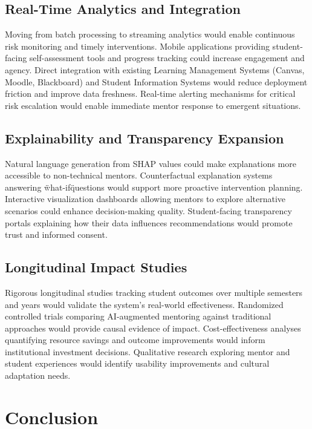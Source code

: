 \documentclass[conference]{IEEEtran}
\begin{document}
\subsection{Real-Time Analytics and Integration}
Moving from batch processing to streaming analytics would enable continuous risk monitoring and timely interventions. Mobile applications providing student-facing self-assessment tools and progress tracking could increase engagement and agency. Direct integration with existing Learning Management Systems (Canvas, Moodle, Blackboard) and Student Information Systems would reduce deployment friction and improve data freshness. Real-time alerting mechanisms for critical risk escalation would enable immediate mentor response to emergent situations.

\subsection{Explainability and Transparency Expansion}
Natural language generation from SHAP values could make explanations more accessible to non-technical mentors. Counterfactual explanation systems answering \"what-if\" questions would support more proactive intervention planning. Interactive visualization dashboards allowing mentors to explore alternative scenarios could enhance decision-making quality. Student-facing transparency portals explaining how their data influences recommendations would promote trust and informed consent.

\subsection{Longitudinal Impact Studies}
Rigorous longitudinal studies tracking student outcomes over multiple semesters and years would validate the system's real-world effectiveness. Randomized controlled trials comparing AI-augmented mentoring against traditional approaches would provide causal evidence of impact. Cost-effectiveness analyses quantifying resource savings and outcome improvements would inform institutional investment decisions. Qualitative research exploring mentor and student experiences would identify usability improvements and cultural adaptation needs.


\section{Conclusion}
\end{document}
